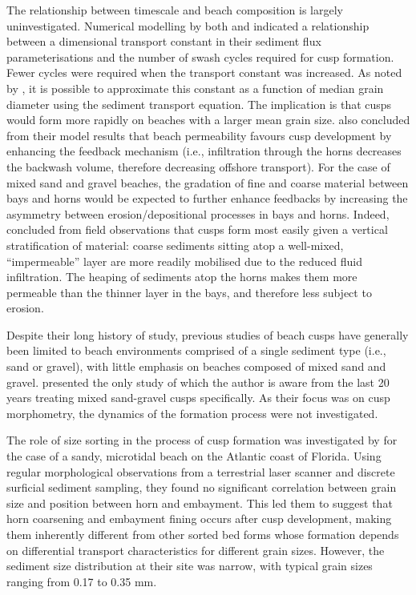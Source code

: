 The relationship between timescale and beach composition is largely uninvestigated. Numerical modelling by both \citet{Coco_etal2000} and \citet{Dodd_etal2008} indicated a relationship between a dimensional transport constant in their sediment flux parameterisations and the number of swash cycles required for cusp formation. Fewer cycles were required when the transport constant was increased. As noted by \citet{Dodd_etal2008}, it is possible to approximate this constant as a function of median grain diameter using the \citet{vanRijn1984} sediment transport equation. The implication is that cusps would form more rapidly on beaches with a larger mean grain size. \citet{Dodd_etal2008} also concluded from their model results that beach permeability favours cusp development by enhancing the feedback mechanism (i.e., infiltration through the horns decreases the backwash volume, therefore decreasing offshore transport). For the case of mixed sand and gravel beaches, the gradation of fine and coarse material between bays and horns would be expected to further enhance feedbacks by increasing the asymmetry between erosion/depositional processes in bays and horns. Indeed, \citet{LonguetHiggins_Parkin1962} concluded from field observations that cusps form most easily given a vertical stratification of material: coarse sediments sitting atop a well-mixed, ``impermeable'' layer are more readily mobilised due to the reduced fluid infiltration. The heaping of sediments atop the horns makes them more permeable than the thinner layer in the bays, and therefore less subject to erosion. 

Despite their long history of study, previous studies of beach cusps have generally been limited to beach environments comprised of a single sediment type (i.e., sand or gravel), with little emphasis on beaches composed of mixed sand and gravel. \citet{Nolan_etal1999} presented the only study of which the author is aware from the last 20 years treating mixed sand-gravel cusps specifically. As their focus was on cusp morphometry, the dynamics of the formation process were not investigated. 

The role of size sorting in the process of cusp formation was investigated by \citet{VanGaalen_etal2011} for the case of a sandy, microtidal beach on the Atlantic coast of Florida. Using regular morphological observations from a terrestrial laser scanner and discrete surficial sediment sampling, they found no significant correlation between grain size and position between horn and embayment. This led them to suggest that horn coarsening and embayment fining occurs after cusp development, making them inherently different from other sorted bed forms whose formation depends on differential transport characteristics for different grain sizes. However, the sediment size distribution at their site was narrow, with typical grain sizes ranging from 0.17 to 0.35 mm. 

